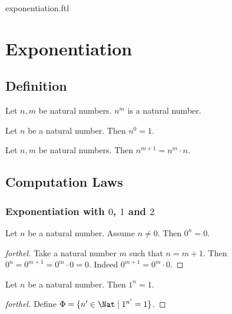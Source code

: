 \documentclass{naproche-library}
\begin{document}
\begin{smodule}{exponentiation.ftl}

  \section*{Exponentiation}

  \subsection*{Definition}

  \begin{signature}[forthel,id=ARITHMETIC_09_3663815629602816]
    Let $n, m$ be natural numbers.
    $n^{m}$ is a natural number.
  \end{signature}

  \begin{axiom}[forthel,id=ARITHMETIC_09_5368818025103360]
    Let $n$ be a natural number.
    Then $n^{0} = 1$.
  \end{axiom}

  \begin{axiom}[forthel,id=ARITHMETIC_09_4140498660884480]
    Let $n, m$ be natural numbers.
    Then $n^{m + 1} = n^{m} \cdot n$.
  \end{axiom}


  \subsection*{Computation Laws}

  \subsubsection*{Exponentiation with $0$, $1$ and $2$}

  \begin{proposition}[forthel,id=ARITHMETIC_09_4673644676513792]
    Let $n$ be a natural number.
    Assume $n \neq 0$.
    Then $0^{n} = 0$.
  \end{proposition}
  \begin{proof}[forthel]
    Take a natural number $m$ such that $n = m + 1$.
    Then $0^{n}
      = 0^{m + 1}
      = 0^{m} \cdot 0
      = 0$.
    Indeed $0^{m + 1} = 0^{m} \cdot 0$.
  \end{proof}

  \begin{proposition}[forthel,id=ARITHMETIC_09_7376849881530368]
    Let $n$ be a natural number.
    Then $1^{n} = 1$.
  \end{proposition}
  \begin{proof}[forthel]
    Define $\Phi = \{ n' \in \Nat \mid 1^{n'} = 1 \}$.


\end{proof}
\end{smodule}
\end{document}
